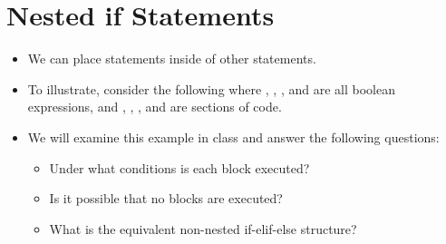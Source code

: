 \documentclass[letterpaper,10pt,english]{sphinxmanual}
\begin{document}
\section{Nested if Statements}
\label{\detokenize{lecture_notes/lec11_conditionals2:nested-if-statements}}\begin{itemize}
\item {} 
We can place  statements inside of other  statements.

\item {} 
To illustrate, consider the following where , ,
, and  are all boolean expressions, and ,
, , and  are sections of code.

\begin{sphinxVerbatim}[commandchars=\\\{\}]
 
     
     
 
\end{sphinxVerbatim}

\item {} 
We will examine this example in class and answer the following
questions:
\begin{itemize}
\item {} 
Under what conditions is each block executed?

\item {} 
Is it possible that no blocks are executed?

\item {} 
What is the equivalent non-nested if-elif-else structure?

\end{itemize}

\end{itemize}
\end{document}
